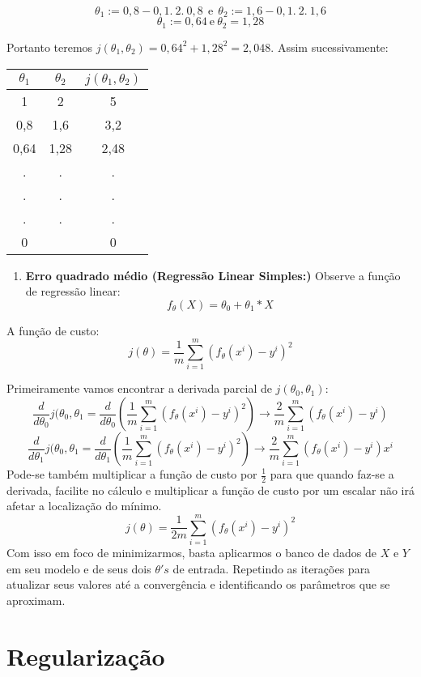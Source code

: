\documentclass[
  openany]{book}
\providecommand{\tightlist}{%
  \setlength{\itemsep}{0pt}\setlength{\parskip}{0pt}}
\begin{document}
\[\theta_1:=0,8-0,1.\ 2.\ 0,8 \ \ \mbox{e}\ \ \theta_2:=1,6-0,1.\ 2.\ 1,6\]
\[\theta_1:=0,64 \ \mbox{e} \ \theta_2=1,28\]

Portanto teremos \(j(\theta_1,\theta_2)=0,64^2+1,28^2=2,048\). Assim sucessivamente:

\begin{longtable}[]{@{}ccc@{}}
\toprule
\textbf{\(\theta_1\)} & \textbf{\(\theta_2\)} & \textbf{\(j(\theta_1,\theta_2)\)}\tabularnewline
\midrule
\endhead
1 & 2 & 5\tabularnewline
0,8 & 1,6 & 3,2\tabularnewline
0,64 & 1,28 & 2,48\tabularnewline
. & . & .\tabularnewline
. & . & .\tabularnewline
. & . & .\tabularnewline
0 & & 0\tabularnewline
\bottomrule
\end{longtable}

\begin{enumerate}
\def\labelenumi{\arabic{enumi}.}
\setcounter{enumi}{2}
\tightlist
\item
  \textbf{Erro quadrado médio (Regressão Linear Simples:)} Observe a função de regressão linear:
  \[f_\theta(X)=\theta_0+\theta_1*X\]
\end{enumerate}

A função de custo:
\[j(\theta)=\frac{1}{m}\displaystyle \sum^m_{i=1}(f_\theta(x^i)-y^i)^2\]

Primeiramente vamos encontrar a derivada parcial de \(j(\theta_0,\theta_1)\):
\[\frac{d}{d\theta_0}j(\theta_0,\theta_1=\frac{d}{d\theta_0}(\frac{1}{m}\displaystyle \sum^m_{i=1}(f_{\theta}(x^i)-y^i)^2) \rightarrow \frac{2}{m}\displaystyle \sum^m_{i=1}(f_\theta(x^i)-y^i) \]
\[\frac{d}{d\theta_1}j(\theta_0,\theta_1=\frac{d}{d\theta_1}(\frac{1}{m}\displaystyle \sum^m_{i=1}(f_{\theta}(x^i)-y^i)^2) \rightarrow \frac{2}{m}\displaystyle \sum^m_{i=1}(f_\theta(x^i)-y^i)x^i\]
Pode-se também multiplicar a função de custo por \(\frac{1}{2}\) para que quando faz-se a derivada, facilite no cálculo e multiplicar a função de custo por um escalar não irá afetar a localização do mínimo.
\[j(\theta)=\frac{1}{2m}\displaystyle \sum^m_{i=1}(f_\theta(x^i)-y^i)^2\]
Com isso em foco de minimizarmos, basta aplicarmos o banco de dados de \(X\) e \(Y\) em seu modelo e de seus dois \(\theta's\) de entrada. Repetindo as iterações para atualizar seus valores até a convergência e identificando os parâmetros que se aproximam.

\hypertarget{regularizacao}{%
\section{Regularização}\label{regularizacao}}
\end{document}
